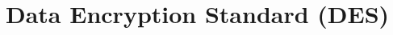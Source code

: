 \documentclass[../main.tex]{subfiles}
\begin{document}
\chapter{Data Encryption Standard (DES)}
\end{document}
